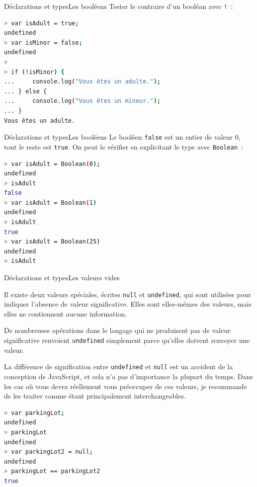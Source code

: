 \documentclass{beamer}
\begin{document}
    \begin{frame}[fragile]{Déclarations et types}{Les booléens}
        Tester le contraire d'un booléan avec \lstinline{!}~:
        \begin{lstlisting}[language=Bash]
> var isAdult = true;
undefined
> var isMinor = false;
undefined
>
> if (!isMinor) {
...     console.log("Vous êtes un adulte.");
... } else {
...     console.log("Vous êtes un mineur.");
... }
Vous êtes un adulte.
        \end{lstlisting}
    \end{frame}

    \begin{frame}[fragile]{Déclarations et types}{Les booléens}
        Le booléen \lstinline{false} est un entier de valeur 0, tout le reste est \lstinline{true}.
        \bigbreak
        On peut le vérifier en explicitant le type avec \lstinline{Boolean}~:
        \begin{lstlisting}[language=Bash]
> var isAdult = Boolean(0);
undefined
> isAdult
false
> var isAdult = Boolean(1)
undefined
> isAdult
true
> var isAdult = Boolean(25)
undefined
> isAdult
        \end{lstlisting}
    \end{frame}

    \begin{frame}[fragile]{Déclarations et types}{Les valeurs vides}
        \begin{footnotesize}
            Il existe deux valeurs spéciales, écrites \lstinline{null} et \lstinline{undefined}, qui sont utilisées pour indiquer l'absence de valeur significative.
            Elles sont elles-mêmes des valeurs, mais elles ne contiennent aucune information.

            De nombreuses opérations dans le langage qui ne produisent pas de valeur significative renvoient \lstinline{undefined} simplement parce qu'elles doivent renvoyer une valeur.

            La différence de signification entre \lstinline{undefined} et \lstinline{null} est un accident de la conception de JavaScript, et cela n'a pas d'importance la plupart du temps.
            Dans les cas où vous devez réellement vous préoccuper de ces valeurs, je recommande de les traiter comme étant principalement interchangeables.
        \end{footnotesize}
        \begin{lstlisting}[language=Bash]
> var parkingLot;
undefined
> parkingLot
undefined
> var parkingLot2 = null;
undefined
> parkingLot == parkingLot2
true
        \end{lstlisting}
    \end{frame}
\end{document}
